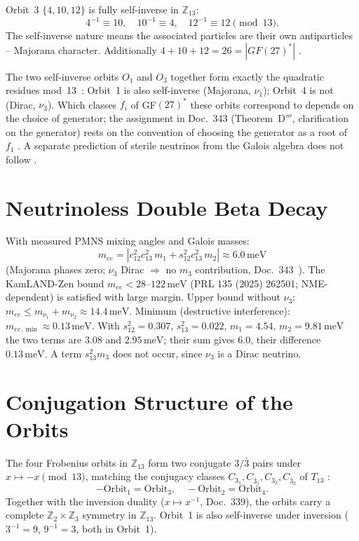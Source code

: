 Orbit~3 $\{4,10,12\}$ is fully self-inverse in $\mathbb{Z}_{13}$:
\[
4^{-1}\equiv10,\quad 10^{-1}\equiv4,\quad 12^{-1}\equiv12\pmod{13}.
\]
The self-inverse nature means the associated particles are their own
antiparticles -- Majorana character. Additionally $4+10+12=26=|GF(27)^*|$
\BM.

The two self-inverse orbits $O_1$ and $O_3$ together form exactly the
quadratic residues mod~13 \BM\,\LM: Orbit~1 is also self-inverse (Majorana,
$\nu_1$); Orbit~4 is not (Dirac, $\nu_3$). Which classes $f_i$ of GF$(27)^*$
these orbits correspond to depends on the choice of generator; the assignment
in Doc.~343 (Theorem~D$'''$, clarification on the generator) rests on the
convention of choosing the generator as a root of $f_1$ \SetzM. A separate
prediction of sterile neutrinos from the Galois algebra does not follow \BM.

\section{Neutrinoless Double Beta Decay \KM}

With measured PMNS mixing angles and Galois masses:
\[
m_{ee}=\left|c_{12}^2c_{13}^2\,m_1+s_{12}^2c_{13}^2\,m_2\right|
\approx6.0\,\text{meV}
\]
(Majorana phases zero; $\nu_3$ Dirac $\Rightarrow$ no $m_3$ contribution, Doc.~343~\BM).
The KamLAND-Zen bound $m_{ee}<28$--$122\,\text{meV}$ (PRL 135 (2025) 262501; NME-dependent) is satisfied with
large margin. Upper bound without $\nu_3$: $m_{ee}\leq m_{\nu_1}+m_{\nu_2}\approx14.4\,\text{meV}$.
Minimum (destructive interference): $m_{ee,\min}\approx0.13\,\text{meV}$.
With $s_{12}^2=0.307$, $s_{13}^2=0.022$, $m_1=4.54$, $m_2=9.81\,\text{meV}$ the
two terms are $3.08$ and $2.95\,\text{meV}$; their sum gives $6.0$, their
difference $0.13\,\text{meV}$. A term $s_{13}^2m_3$ does not occur, since
$\nu_3$ is a Dirac neutrino.

\section{Conjugation Structure of the Orbits \BM}

The four Frobenius orbits in $\mathbb{Z}_{13}$ form two conjugate
$3/\bar{3}$ pairs under $x\mapsto-x\pmod{13}$, matching the
conjugacy classes $C_{3_1}, C_{\bar3_1}, C_{3_2}, C_{\bar3_2}$
of $T_{13}$ \cite{Hartmann2011}:
\[
-\text{Orbit}_1=\text{Orbit}_3,\quad
-\text{Orbit}_2=\text{Orbit}_4.
\]
Together with the inversion duality ($x\mapsto x^{-1}$, Doc.~339),
the orbits carry a complete $\mathbb{Z}_2\times\mathbb{Z}_3$
symmetry in $\mathbb{Z}_{13}$.
Orbit~1 is also self-inverse under inversion ($3^{-1}=9$,
$9^{-1}=3$, both in Orbit~1).

